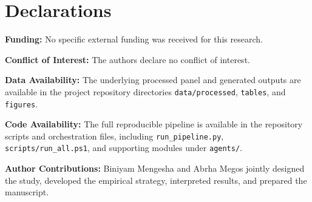 \section*{Declarations}
\textbf{Funding:} No specific external funding was received for this research.

\textbf{Conflict of Interest:} The authors declare no conflict of interest.

\textbf{Data Availability:} The underlying processed panel and generated outputs are available in the project repository directories \texttt{data/processed}, \texttt{tables}, and \texttt{figures}.

\textbf{Code Availability:} The full reproducible pipeline is available in the repository scripts and orchestration files, including \texttt{run\_pipeline.py}, \texttt{scripts/run\_all.ps1}, and supporting modules under \texttt{agents/}.

\textbf{Author Contributions:} Biniyam Mengesha and Abrha Megos jointly designed the study, developed the empirical strategy, interpreted results, and prepared the manuscript.

